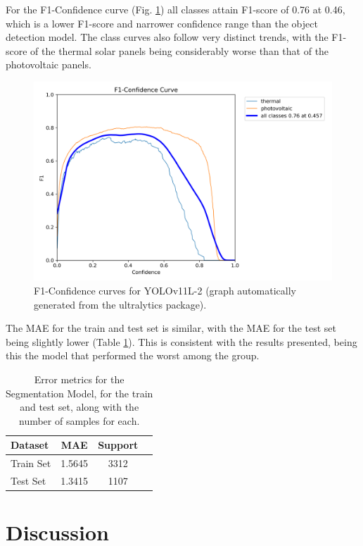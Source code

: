 \documentclass[conference]{IEEEtran}
\begin{document}
For the F1-Confidence curve (Fig. \ref{fig:model02_yolof1}) all classes attain F1-score of 0.76 at 0.46, which is a lower F1-score and narrower confidence range than the object detection model. The class curves also follow very distinct trends, with the F1-score of the thermal solar panels being considerably worse than that of the photovoltaic panels.

\begin{figure}[H]
    \centering
    \includegraphics[width=1\linewidth]{assets/model02_yolof1.png}
    \caption{F1-Confidence curves for YOLOv11L-2 (graph automatically generated from the ultralytics package).}
    \label{fig:model02_yolof1}
\end{figure}

The MAE for the train and test set is similar, with the MAE for the test set being slightly lower (Table \ref{tab:model02_results}). This is consistent with the results presented, being this the model that performed the worst among the group.

\begin{table}[H]
\centering
\caption{Error metrics for the Segmentation Model, for the train and test set, along with the number of samples for each.}
\label{tab:model02_results}
\begin{tabular}{lccc}
\toprule
\textbf{Dataset} & \textbf{MAE} & \textbf{Support} \\
\midrule
Train Set & 1.5645 & 3312 \\
Test Set & 1.3415 & 1107 \\
\bottomrule
\end{tabular}
\end{table}


\section{Discussion}
\end{document}
